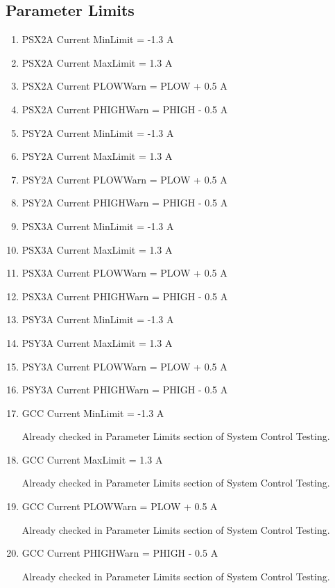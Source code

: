 \documentclass[11pt]{book}		%
\begin{document}
\subsection{Parameter Limits}

\begin{enumerate}
 \item PSX2A Current MinLimit = -1.3 A
 \item PSX2A Current MaxLimit = 1.3 A
 \item PSX2A Current PLOWWarn = PLOW + 0.5 A
 \item PSX2A Current PHIGHWarn = PHIGH - 0.5 A
 \item PSY2A Current MinLimit = -1.3 A
 \item PSY2A Current MaxLimit = 1.3 A
 \item PSY2A Current PLOWWarn = PLOW + 0.5 A
 \item PSY2A Current PHIGHWarn = PHIGH - 0.5 A
 \item PSX3A Current MinLimit = -1.3 A
 \item PSX3A Current MaxLimit = 1.3 A
 \item PSX3A Current PLOWWarn = PLOW + 0.5 A
 \item PSX3A Current PHIGHWarn = PHIGH - 0.5 A
 \item PSY3A Current MinLimit = -1.3 A
 \item PSY3A Current MaxLimit = 1.3 A
 \item PSY3A Current PLOWWarn = PLOW + 0.5 A
 \item PSY3A Current PHIGHWarn = PHIGH - 0.5 A
 \item GCC Current MinLimit = -1.3 A

\color{red}
Already checked in Parameter Limits section of System Control Testing.
\color{black}

 \item GCC Current MaxLimit = 1.3 A

\color{red}
Already checked in Parameter Limits section of System Control Testing.
\color{black}

 \item GCC Current PLOWWarn = PLOW + 0.5 A

\color{red}
Already checked in Parameter Limits section of System Control Testing.
\color{black}

 \item GCC Current PHIGHWarn = PHIGH - 0.5 A

\color{red}
Already checked in Parameter Limits section of System Control Testing.
\color{black}

\end{enumerate}
\end{document}
